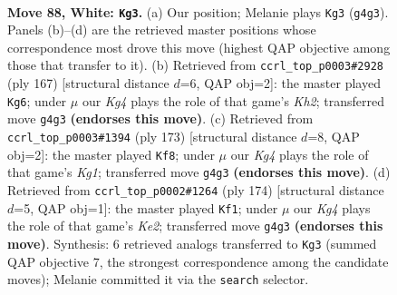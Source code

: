 \documentclass[11pt]{article}
\begin{document}
\clearpage

\begin{figure}[p]\centering
\begin{subfigure}{0.46\textwidth}\centering
\resizebox{\linewidth}{!}{%
\newchessgame
\chessboard[
  setfen={5r1k/P7/3R4/8/6K1/8/8/8 w - - 45 88},
  showmover=false,
  pgfstyle=straightmove, color=movearrow, markmove={g4-g3}
]}
\caption{}
\end{subfigure}\hfill
\begin{subfigure}{0.46\textwidth}\centering
\resizebox{\linewidth}{!}{%
\newchessgame
\chessboard[
  setfen={8/7k/r7/5p2/5R1K/8/6P1/8 b - - 0 84},
  showmover=false,
  pgfstyle=straightmove, color=movearrow, markmove={h7-g6}
]}
\caption{}
\end{subfigure}
\\[4pt]
\begin{subfigure}{0.46\textwidth}\centering
\resizebox{\linewidth}{!}{%
\newchessgame
\chessboard[
  setfen={6k1/4R3/8/4K3/8/8/8/8 b - - 14 87},
  showmover=false,
  pgfstyle=straightmove, color=movearrow, markmove={g8-f8}
]}
\caption{}
\end{subfigure}\hfill
\begin{subfigure}{0.46\textwidth}\centering
\resizebox{\linewidth}{!}{%
\newchessgame
\chessboard[
  setfen={8/8/k5r1/8/1R6/7p/4K2P/8 w - - 1 88},
  showmover=false,
  pgfstyle=straightmove, color=movearrow, markmove={e2-f1}
]}
\caption{}
\end{subfigure}
\caption{\textbf{Move 88, White: \texttt{Kg3}.} (a) Our position; Melanie plays \texttt{Kg3} (\texttt{g4g3}). Panels (b)--(d) are the retrieved master positions whose correspondence most drove this move (highest QAP objective among those that transfer to it). (b) Retrieved from \texttt{ccrl\_top\_p0003\#2928} (ply 167) [structural distance $d$=6, QAP obj=2]: the master played \texttt{Kg6}; under $\mu$ our \emph{Kg4} plays the role of that game's \emph{Kh2}; transferred move \texttt{g4g3} \textbf{(endorses this move)}. (c) Retrieved from \texttt{ccrl\_top\_p0003\#1394} (ply 173) [structural distance $d$=8, QAP obj=2]: the master played \texttt{Kf8}; under $\mu$ our \emph{Kg4} plays the role of that game's \emph{Kg1}; transferred move \texttt{g4g3} \textbf{(endorses this move)}. (d) Retrieved from \texttt{ccrl\_top\_p0002\#1264} (ply 174) [structural distance $d$=5, QAP obj=1]: the master played \texttt{Kf1}; under $\mu$ our \emph{Kg4} plays the role of that game's \emph{Ke2}; transferred move \texttt{g4g3} \textbf{(endorses this move)}. Synthesis: 6 retrieved analogs transferred to \texttt{Kg3} (summed QAP objective 7, the strongest correspondence among the candidate moves); Melanie committed it via the \texttt{search} selector.}
\label{fig:thought-m174}
\end{figure}
\end{document}
